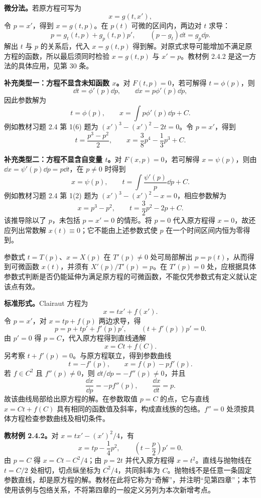 \textbf{微分法。}若原方程可写为
\[
x=g(t,x'),
\]
令 $p=x'$，得到 $x=g(t,p)$。在 $p(t)$ 可微的区间内，两边对 $t$ 求导：
\[
p=g_t(t,p)+g_p(t,p)p',\qquad
\boxed{(p-g_t)\dd t=g_p\dd p.}
\]
解出 $t$ 与 $p$ 的关系后，代入 $x=g(t,p)$ 得到解。对原式求导可能增加不满足原方程的函数，所以最后须同时检验 $x=g(t,p)$ 与 $x'=p$。教材例 2.4.2 是这一方法的具体应用，见第 30 条。

\textbf{补充类型一：方程不显含未知函数 $x$。}对 $F(t,p)=0$，若可解得 $t=\phi(p)$，则
\[
\dd t=\phi'(p)\dd p,\qquad \dd x=p\phi'(p)\dd p,
\]
因此参数解为
\[
\boxed{t=\phi(p),\qquad x=\int p\phi'(p)\dd p+C.}
\]
例如教材习题 2.4 第 1(6) 题为 $(x')^3-(x')^2-2t=0$。令 $p=x'$，得到
\[
\boxed{t=\frac{p^3-p^2}{2},\qquad x=\frac38p^4-\frac13p^3+C.}
\]

\textbf{补充类型二：方程不显含自变量 $t$。}对 $F(x,p)=0$，若可解得 $x=\psi(p)$，则由 $\dd x=\psi'(p)\dd p=p\dd t$，在 $p\ne0$ 时得到
\[
\boxed{x=\psi(p),\qquad t=\int\frac{\psi'(p)}p\dd p+C.}
\]
例如教材习题 2.4 第 1(2) 题为 $(x')^3-(x')^2-x=0$，相应参数解为
\[
\boxed{x=p^3-p^2,\qquad t=\frac32p^2-2p+C.}
\]
该推导除以了 $p$，未包括 $p=x'=0$ 的情形。将 $p=0$ 代入原方程得 $x=0$，故还应列出常数解 $x(t)\equiv0$；它不能由上述参数式使 $p$ 在一个时间区间内恒为零得到。

参数式 $t=T(p)$、$x=X(p)$ 在 $T'(p)\ne0$ 处可局部解出 $p=p(t)$，从而得到可微函数 $x(t)$，并须有 $X'(p)/T'(p)=p$。在 $T'(p)=0$ 处，应根据具体参数式判断是否仍能延伸为满足原方程的可微函数，不能仅凭参数式有定义就认定该点有效。

\textbf{标准形式。}Clairaut 方程为
\[
\boxed{x=tx'+f(x').}
\]
令 $p=x'$，对 $x=tp+f(p)$ 两边求导，得
\[
p=p+tp'+f'(p)p',\qquad (t+f'(p))p'=0.
\]
由 $p'=0$ 得 $p=C$，代入原方程得到直线通解
\[
\boxed{x=Ct+f(C).}
\]
另考察 $t+f'(p)=0$。与原方程联立，得到参数曲线
\[
\boxed{t=-f'(p),\qquad x=f(p)-pf'(p).}
\]
若 $f\in C^2$ 且 $f''(p)\ne0$，则 $\dd t/\dd p=-f''(p)\ne0$，并且
\[
\frac{\dd x}{\dd p}=-pf''(p),\qquad
\frac{\dd x}{\dd t}=p.
\]
故该曲线局部给出原方程的解。在参数取值 $p=C$ 的点，它与直线 $x=Ct+f(C)$ 具有相同的函数值及斜率，构成直线族的包络。$f''=0$ 处须按具体方程检查参数曲线及相切条件。

\textbf{教材例 2.4.2。}对 $x=tx'-(x')^2/4$，有
\[
x=tp-\frac14p^2,\qquad \left(t-\frac p2\right)p'=0.
\]
由 $p=C$ 得 $x=Ct-C^2/4$；由 $p=2t$ 并代入原方程得 $x=t^2$。直线与抛物线在 $t=C/2$ 处相切，切点纵坐标为 $C^2/4$，共同斜率为 $C$。抛物线不是任意一条固定参数直线，却是原方程的解。教材在此将它称为“奇解”，并注明“见第四章”；本节使用该例与包络关系，不将第四章的一般定义另列为本次新增考点。

